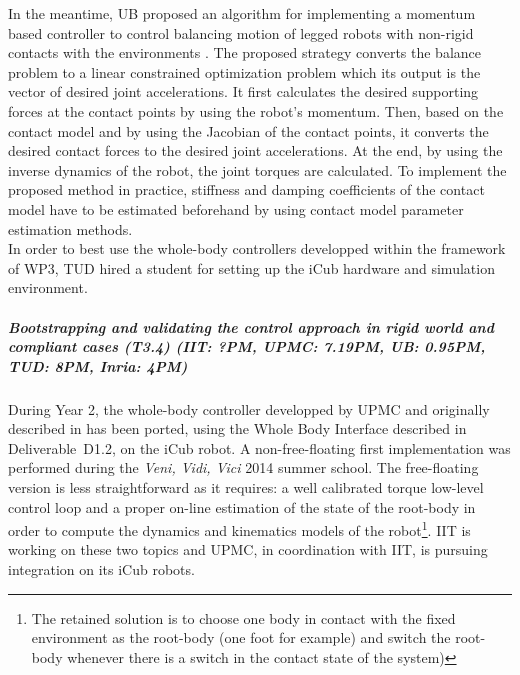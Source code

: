 In the meantime, UB proposed an algorithm for implementing a momentum
based controller to control balancing motion of legged robots with non-rigid
contacts with the environments \cite{Azad&Mistry15}.  The proposed strategy
converts the balance problem to a linear constrained optimization problem
which its output is the vector of desired joint accelerations.  It first
calculates the desired supporting forces at the contact points by using the
robot’s momentum.  Then, based on the contact model and by using the Jacobian
of the contact points, it converts the desired contact forces to the desired
joint accelerations.  At the end, by using the inverse dynamics of the robot,
the joint torques are calculated.  To implement the proposed method in
practice, stiffness and damping coefficients of the contact model have to be
estimated beforehand by using contact model parameter estimation methods.\\
    
In order to best use the whole-body controllers developped within the framework of WP3, TUD hired a student for setting up the iCub hardware and simulation environment.


\subparagraph{Bootstrapping and validating the control approach in rigid world and compliant cases (T3.4) (IIT: ?PM, UPMC: 7.19PM, UB: 0.95PM, TUD: 8PM, Inria: 4PM)}

During Year 2, the whole-body controller developped by UPMC and originally described in \cite{salini2012} has been ported, using the Whole Body Interface described in Deliverable~D1.2, on the iCub robot. A non-free-floating first implementation was performed during the \textit{Veni, Vidi, Vici} 2014 summer school. The free-floating version is less straightforward as it requires: a well calibrated torque low-level control loop and a proper on-line estimation of the state of the root-body in order to  compute the dynamics and kinematics models of the robot\footnote{The retained solution is to choose one body in contact with the fixed environment as the root-body (one foot for example) and switch the root-body whenever there is a switch in the contact state of the system)}. IIT is working on these two topics and UPMC, in coordination with IIT, is pursuing integration on its iCub robots.

